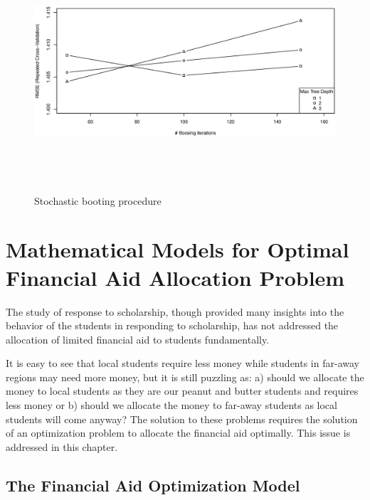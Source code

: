\documentclass[12pt,english]{report}
\begin{document}
\begin{figure}[ht]
   \centering
\includegraphics[width=5in,
height=3.5in,scale=0.5]{pic/Stochastic_boositing.eps}
 \caption{Stochastic booting procedure}
 \label{boosting}
\end{figure}


\chapter{Mathematical Models for Optimal Financial Aid  Allocation Problem }

The study of response to scholarship, though provided many insights into the
behavior 
of the students in responding to scholarship, has not addressed the allocation
of limited 
financial aid to students fundamentally.

It is easy to see that local students require less money while students in
far-away regions
may need more money,  but it is still puzzling as: a) should we allocate the
money to local
students as they are our peanut and butter students and requires less money or
b) should we
allocate the money to far-away students as local students will come anyway? The
solution to
these problems requires the solution of an optimization problem to allocate the
financial 
aid optimally.  This issue is addressed in this chapter.
% 
% 

\section{The Financial Aid Optimization Model}
\end{document}
